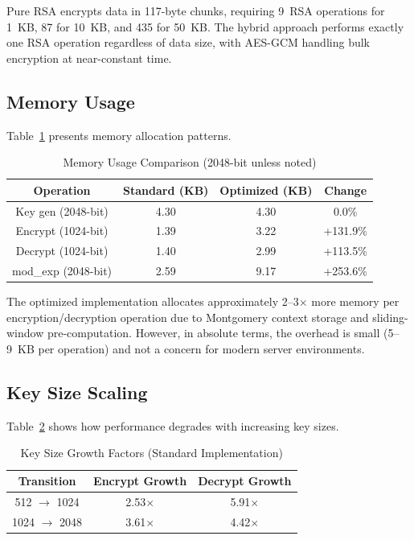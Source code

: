 \documentclass[conference]{IEEEtran}
\begin{document}
Pure RSA encrypts data in 117-byte chunks, requiring 9~RSA operations for 1~KB, 87 for 10~KB, and 435 for 50~KB. The hybrid approach performs exactly one RSA operation regardless of data size, with AES-GCM handling bulk encryption at near-constant time.

\subsection{Memory Usage}

Table~\ref{tab:memory} presents memory allocation patterns.

\begin{table}[htbp]
\caption{Memory Usage Comparison (2048-bit unless noted)}
\begin{center}
\begin{tabular}{|c|c|c|c|}
\hline
\textbf{Operation} & \textbf{Standard (KB)} & \textbf{Optimized (KB)} & \textbf{Change} \\
\hline
Key gen (2048-bit) & 4.30 & 4.30 & 0.0\% \\
\hline
Encrypt (1024-bit) & 1.39 & 3.22 & +131.9\% \\
\hline
Decrypt (1024-bit) & 1.40 & 2.99 & +113.5\% \\
\hline
mod\_exp (2048-bit) & 2.59 & 9.17 & +253.6\% \\
\hline
\end{tabular}
\label{tab:memory}
\end{center}
\end{table}

The optimized implementation allocates approximately 2--3$\times$ more memory per encryption/decryption operation due to Montgomery context storage and sliding-window pre-computation. However, in absolute terms, the overhead is small (5--9~KB per operation) and not a concern for modern server environments.

\subsection{Key Size Scaling}

Table~\ref{tab:scaling} shows how performance degrades with increasing key sizes.

\begin{table}[htbp]
\caption{Key Size Growth Factors (Standard Implementation)}
\begin{center}
\begin{tabular}{|c|c|c|}
\hline
\textbf{Transition} & \textbf{Encrypt Growth} & \textbf{Decrypt Growth} \\
\hline
512 $\rightarrow$ 1024 & 2.53$\times$ & 5.91$\times$ \\
\hline
1024 $\rightarrow$ 2048 & 3.61$\times$ & 4.42$\times$ \\
\hline
\end{tabular}
\label{tab:scaling}
\end{center}
\end{table}
\end{document}
